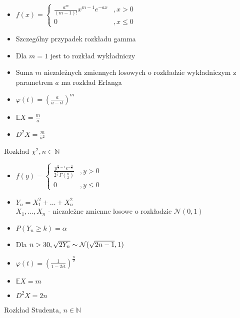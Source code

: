 \documentclass[a4paper,12pt]{report}
\theoremstyle{break}
\theoremstyle{definition}
\theoremstyle{defi}
\theoremstyle{break}
\theoremstyle{defi}
\begin{document}
\begin{multicols}{2}
\begin{itemize}
\item $ f(x)=
\left \{
\begin{array}{ll}
\frac{a^m}{\left(m-1\right)!}x^{m-1}e^{-ax}&,x>0\\
0&,x\le0
\end{array}
\right . $
\item Szczególny przypadek rozkładu gamma
\item Dla $ m=1 $ jest to rozkład wykładniczy
\columnbreak
\item Suma $ m $ niezależnych zmiennych losowych o rozkładzie wykładniczym z parametrem $ a $ ma rozkład Erlanga
\item $ \varphi(t)=\left(\frac{a}{a-it}\right)^m $
\item $ \mathbb E X=\frac{m}{a} $
\item $ D^2X=\frac{m}{a^2} $
\end{itemize}
\end{multicols}
{\Large Rozkład $ \chi^2 ,n\in \mathbb N $}
\begin{multicols}{2}
\begin{itemize}
\item $ f(y)=
\left \{
\begin{array}{ll}
\frac{y^{\frac{n}{2}-1}e^{-\frac{y}{2}}}{2^{\frac{n}{2}}\Gamma\left(\frac{n}{2}\right)}&,y>0\\
0&,y\le0
\end{array}
\right . $
\item $ Y_n=X_1^2+\dots+X_n^2 $\\
$ X_1,\dots,X_n$ - niezależne zmienne losowe o rozkładzie $ \mathcal N(0,1) $ 
\item $ P(Y_n\ge k)=\alpha $
\item Dla $ n>30,\\
 \sqrt{2Y_n}\sim\mathcal N(\sqrt{2n-1},1) $
 \item $ \varphi(t)=\left(\frac{1}{1-2it}\right)^{\frac{n}{2}} $
 \item $ \mathbb E X=m $
 \item $ D^2X=2n $
\end{itemize}
\end{multicols}
{\Large Rozkład Studenta, $ n\in \mathbb N  $}
\end{document}
